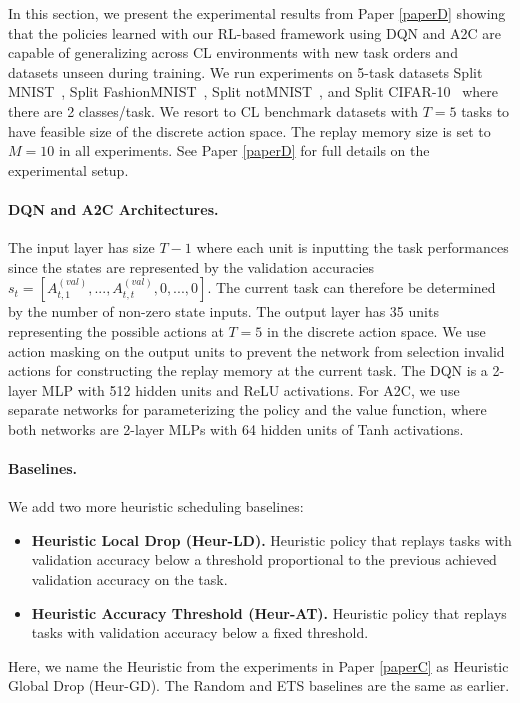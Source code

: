 In this section, we present the experimental results from Paper \ref{paperD} showing that the policies learned with our RL-based framework using DQN and A2C are capable of generalizing across CL environments with new task orders and datasets unseen during training. We run experiments on 5-task datasets Split MNIST~\cite{zenke2017continual}, Split FashionMNIST~\cite{xiao2017fashion}, Split notMNIST~\cite{bulatov2011notMNIST}, and Split CIFAR-10~\cite{krizhevsky2009learning} where there are 2 classes/task. We resort to CL benchmark datasets with $T=5$ tasks to have feasible size of the discrete action space. The replay memory size is set to $M=10$ in all experiments. See Paper \ref{paperD} for full details on the experimental setup. 

\vspace{-3mm}
\paragraph{DQN and A2C Architectures.}
The input layer has size $T-1$ where each unit is inputting the task performances since the states are represented by the validation accuracies $s_t = [A_{t, 1}^{(val)}, ..., A_{t, t}^{(val)}, 0, ..., 0]$. The current task can therefore be determined by the number of non-zero state inputs. The output layer has 35 units representing the possible actions at $T=5$ in the discrete action space. We use action masking on the output units to prevent the network from selection invalid actions for constructing the replay memory at the current task. The DQN is a 2-layer MLP with 512 hidden units and ReLU activations. For A2C, we use separate networks for parameterizing the policy and the value function, where both networks are 2-layer MLPs with 64 hidden units of Tanh activations.

\vspace{-3mm}
\paragraph{Baselines.}
We add two more heuristic scheduling baselines:
\begin{itemize}[itemsep=0em,topsep=1pt]
	\item {\bf Heuristic Local Drop (Heur-LD).} Heuristic policy that replays tasks with validation accuracy below a threshold proportional to the previous achieved validation accuracy on the task. 
	\item {\bf Heuristic Accuracy Threshold (Heur-AT).} Heuristic policy that replays tasks with validation accuracy below a fixed threshold. 
\end{itemize}
Here, we name the Heuristic from the experiments in Paper \ref{paperC} as Heuristic Global Drop (Heur-GD). The Random and ETS baselines are the same as earlier. 

